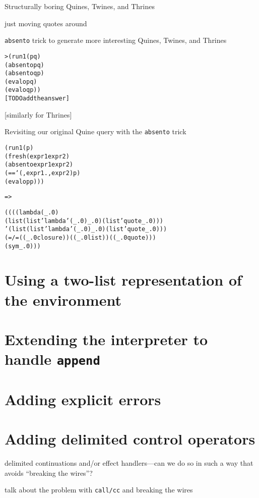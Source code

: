 \documentclass{book}
\begin{document}
Structurally boring Quines, Twines, and Thrines

just moving quotes around

\verb|absento| trick to generate more interesting Quines, Twines, and Thrines

\begin{alltt}
> (run 1 (p q)
    (absento p q)
    (absento q p)    
    (evalo p q)
    (evalo q p))
[TODO add the answer]
\end{alltt}

[similarly for Thrines]

Revisiting our original Quine query with the \verb|absento| trick

\begin{alltt}
(run 1 (p)
  (fresh (expr1 expr2)
    (absento expr1 expr2)
    (== `(,expr1 . ,expr2) p)
    (evalo p p)))
\end{alltt}
\verb|=>|
\begin{alltt}
((((lambda (_.0)
     (list (list 'lambda '(_.0) _.0) (list 'quote _.0)))
   '(list (list 'lambda '(_.0) _.0) (list 'quote _.0)))
  (=/= ((_.0 closure)) ((_.0 list)) ((_.0 quote)))
  (sym _.0)))
\end{alltt}


\chapter{Using a two-list representation of the environment}%


\chapter{Extending the interpreter to handle \texttt{append}}%


\chapter{Adding explicit errors}%


\chapter{Adding delimited control operators}%

delimited continuations and/or effect handlers---can we do so in such a way that avoids ``breaking the wires''?

talk about the problem with \verb|call/cc| and breaking the wires
\end{document}
